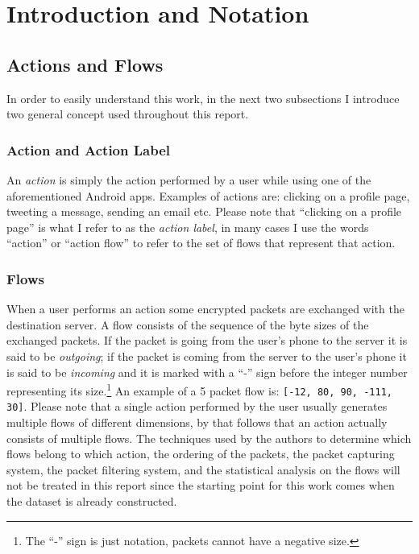 \section{Introduction and Notation}
\label{sec:intro}

\subsection{Actions and Flows}
\label{subsec:flows}
In order to easily understand this work, in the next two subsections I introduce two general concept used throughout this report.

\subsubsection{Action and Action Label}
An \textit{action} is simply the action performed by a user while using one of the aforementioned Android apps. Examples of actions are: clicking on a profile page, tweeting a message, sending an email etc. Please note that ``clicking on a profile page'' is what I refer to as the \textit{action label}, in many cases I use the words ``action'' or ``action flow'' to refer to the set of flows that represent that action.

\subsubsection{Flows}
When a user performs an action some encrypted packets are exchanged with the destination server. A flow consists of the sequence of the byte sizes of the exchanged packets. If the packet is going from the user's phone to the server it is said to be \textit{outgoing}; if the packet is coming from the server to the user's phone it is said to be \textit{incoming} and it is marked with a ``-'' sign before the integer number representing its size.\footnote{The ``-'' sign is just notation, packets cannot have a negative size.} An example of a 5 packet flow is: \texttt{[-12, 80, 90, -111, 30]}. Please note that a single action performed by the user usually generates multiple flows of different dimensions, by that follows that an action actually consists of multiple flows. The techniques used by the authors to determine which flows belong to which action, the ordering of the packets, the packet capturing system, the packet filtering system, and the statistical analysis on the flows will not be treated in this report since the starting point for this work comes when the dataset is already constructed.

